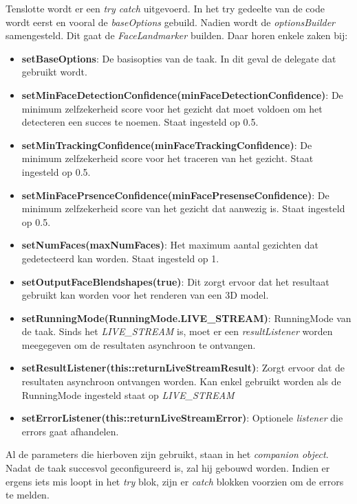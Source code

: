 Tenslotte wordt er een \emph{try catch} uitgevoerd. In het try gedeelte van de code wordt eerst en vooral de \emph{baseOptions} gebuild. Nadien wordt de \emph{optionsBuilder} samengesteld. Dit gaat de \emph{FaceLandmarker} builden. Daar horen enkele zaken bij:
\begin{itemize}
    \item \textbf{setBaseOptions}: De basisopties van de taak. In dit geval de delegate dat gebruikt wordt.
    \item \textbf{setMinFaceDetectionConfidence(minFaceDetectionConfidence)}: De minimum zelfzekerheid score voor het gezicht dat moet voldoen om het detecteren een succes te noemen. Staat ingesteld op 0.5.
    \item \textbf{setMinTrackingConfidence(minFaceTrackingConfidence)}: De minimum zelfzekerheid score voor het traceren van het gezicht. Staat ingesteld op 0.5.
    \item \textbf{setMinFacePrsenceConfidence(minFacePresenseConfidence)}: De minimum zelfzekerheid score van het gezicht dat aanwezig is. Staat ingesteld op 0.5.
    \item \textbf{setNumFaces(maxNumFaces)}: Het maximum aantal gezichten dat gedetecteerd kan worden. Staat ingesteld op 1.
    \item \textbf{setOutputFaceBlendshapes(true)}: Dit zorgt ervoor dat het resultaat gebruikt kan worden voor het renderen van een 3D model.
    \item \textbf{setRunningMode(RunningMode.LIVE\_STREAM)}: RunningMode van de taak. Sinds het \emph{LIVE\_STREAM} is, moet er een \emph{resultListener} worden meegegeven om de resultaten asynchroon te ontvangen.
    \item \textbf{setResultListener(this::returnLiveStreamResult)}: Zorgt ervoor dat de resultaten asynchroon ontvangen worden. Kan enkel gebruikt worden als de RunningMode ingesteld staat op \emph{LIVE\_STREAM}
    \item \textbf{setErrorListener(this::returnLiveStreamError)}: Optionele \emph{listener} die errors gaat afhandelen.
\end{itemize}
Al de parameters die hierboven zijn gebruikt, staan in het \emph{companion object}. Nadat de taak succesvol geconfigureerd is, zal hij gebouwd worden. Indien er ergens iets mis loopt in het \emph{try} blok, zijn er \emph{catch} blokken voorzien om de errors te melden.

